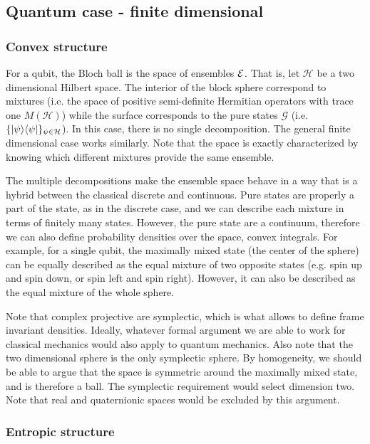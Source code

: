 \subsection{Quantum case - finite dimensional}

\subsubsection{Convex structure}

For a qubit, the Bloch ball is the space of ensembles $\mathcal{E}$. That is, let $\mathcal{H}$ be a two dimensional Hilbert space. The interior of the block sphere correspond to mixtures (i.e. the space of positive semi-definite Hermitian operators with trace one $M(\mathcal{H})$) while the surface corresponds to the pure states $\mathcal{G}$ (i.e. $\{ |\psi\rangle \langle\psi| \}_{\psi \in \mathcal{H}}$). In this case, there is no single decomposition. The general finite dimensional case works similarly. Note that the space is exactly characterized by knowing which different mixtures provide the same ensemble.

The multiple decompositions make the ensemble space behave in a way that is a hybrid between the classical discrete and continuous. Pure states are properly a part of the state, as in the discrete case, and we can describe each mixture in terms of finitely many states. However, the pure state are a continuum, therefore we can also define probability densities over the space, convex integrals. For example, for a single qubit, the maximally mixed state (the center of the sphere) can be equally described as the equal mixture of two opposite states (e.g. spin up and spin down, or spin left and spin right). However, it can also be described as the equal mixture of the whole sphere.

Note that complex projective are symplectic, which is what allows to define frame invariant densities. Ideally, whatever formal argument we are able to work for classical mechanics would also apply to quantum mechanics.  Also note that the two dimensional sphere is the only symplectic sphere. By homogeneity, we should be able to argue that the space is symmetric around the maximally mixed state, and is therefore a ball. The symplectic requirement would select dimension two. Note that real and quaternionic spaces would be excluded by this argument.

\subsubsection{Entropic structure}

